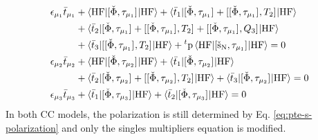 \begin{subequations}\label{eq:pte-s-cc3-multipliers}
  \begin{align}
    \epsilon_{\mu_1}\bar{t}_{\mu_1} &+
     \braket{\mathrm{HF} | [ \check{\Phi}, \tau_{\mu_1} ]^{} | \mathrm{HF}}
   + \braket{\bar{t}_{1} |
       [ \check{\Phi}, \tau_{\mu_1} ]^{}
     + [ [ \check{\Phi}, \tau_{\mu_1} ]^{}, T_2 ]^{}
     | \mathrm{HF}} \nonumber \\
   &+ \braket{\bar{t}_{2} |
       [ \check{\Phi}, \tau_{\mu_1} ]^{}
     + [ [ \check{\Phi}, \tau_{\mu_1} ]^{}, T_2 ]^{}
     + [ [ \check{\Phi}, \tau_{\mu_1} ]^{}, Q_3 ]^{}
   | \mathrm{HF}} \nonumber \\
   &+ \braket{\bar{t}_{3} |
      [ [ \check{\Phi}, \tau_{\mu_1} ]^{}, T_2 ]^{}
     | \mathrm{HF}}
   + {}^t\mathrm{p}\braket{\mathrm{HF} |
   [ \check{\mathrm{s}}_\mathrm{N}, \tau_{\mu_1} ]^{} | \mathrm{HF}}
     = 0 \label{eq:pte-s-cc3-singles-multipliers} \\
    \epsilon_{\mu_2}\bar{t}_{\mu_2} &+
    \braket{\mathrm{HF} | [ \check{\Phi}, \tau_{\mu_2} ]^{} | \mathrm{HF}}
   + \braket{\bar{t}_{1} |
       [ \check{\Phi}, \tau_{\mu_2} ]^{}
     | \mathrm{HF}} \nonumber \\
  &+ \braket{\bar{t}_{2} |
       [ \check{\Phi}, \tau_{\mu_2} ]^{}
     + [ [ \check{\Phi}, \tau_{\mu_2} ]^{}, T_2 ]^{}
     | \mathrm{HF}}
  + \braket{\bar{t}_{3} |
       [ \check{\Phi}, \tau_{\mu_2} ]^{}
     | \mathrm{HF}}
    = 0 \label{eq:pte-s-cc3-doubles-multipliers} \\
    \epsilon_{\mu_3}\bar{t}_{\mu_3} &+
    \braket{\bar{t}_{1} |
       [ \check{\Phi}, \tau_{\mu_3} ]^{}
     | \mathrm{HF}}
  + \braket{\bar{t}_{2} |
       [ \check{\Phi}, \tau_{\mu_3} ]^{}
    | \mathrm{HF}}
    = 0 \label{eq:pte-s-cc3-triples-multipliers}
  \end{align}
\end{subequations}
In both \acrlong*{CC} models, the polarization is still determined by
Eq. \eqref{eq:pte-s-polarization} and only the singles multipliers
equation is modified.

